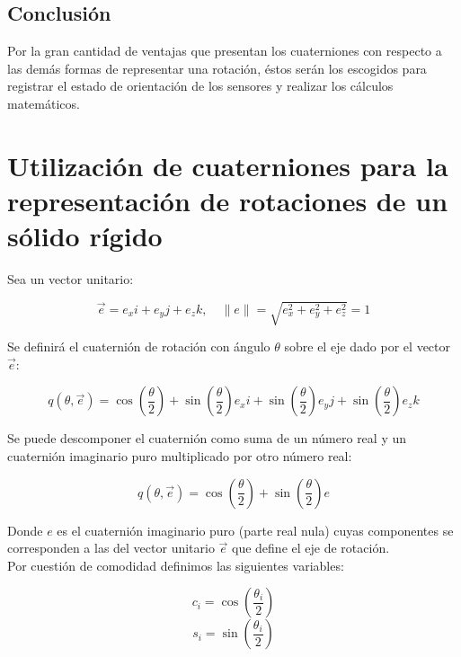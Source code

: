 \documentclass[10pt, a4paper]{report}
\begin{document}
\subsection{Conclusión}

Por la gran cantidad de ventajas que presentan los cuaterniones con respecto a las demás formas de representar una rotación, éstos serán los escogidos para registrar el estado de orientación de los sensores y realizar los cálculos matemáticos.

\section{Utilización de cuaterniones para la representación de rotaciones de un sólido rígido}

Sea un vector unitario:

\begin{equation}
\vec{e} = e_x i + e_y j + e_z k, \quad \|e\| = \sqrt{e_x^2 + e_y^2 + e_z^2} = 1
\end{equation}


Se definirá el cuaternión de rotación con ángulo $\theta$ sobre el eje dado por el vector $\vec{e}$:

\begin{equation}
q(\theta, \vec{e}) = \cos \left(\frac{\theta}{2}\right) + \sin \left(\frac{\theta}{2}\right) e_x i + \sin \left(\frac{\theta}{2}\right) e_y j + \sin \left(\frac{\theta}{2}\right) e_z k 
\end{equation}

Se puede descomponer el cuaternión como suma de un número real y un cuaternión imaginario puro multiplicado por otro número real:

\begin{equation}
q( \theta , \vec{e}) = \cos \left(\frac{\theta}{2}\right) + \sin \left(\frac{\theta}{2}\right) e  
\end{equation}

Donde $e$ es el cuaternión imaginario puro (parte real nula) cuyas componentes se corresponden a las del vector unitario $\vec{e}$ que define el eje de rotación.\\

Por cuestión de comodidad definimos las siguientes variables:

\begin{equation}
c_i = \cos \left( \frac{\theta_i}{2} \right)
\end{equation}
\begin{equation}
s_i = \sin \left( \frac{\theta_i}{2} \right)
\end{equation}
\end{document}
